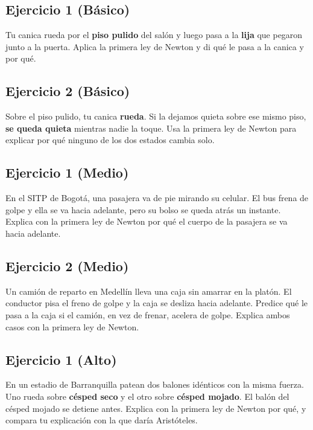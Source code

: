 \documentclass[
  spanish,
  letterpaper,
  12pt,
  oneside,
  open=any,
  DIV=15]{scrbook}
\begin{document}
\subsection{Ejercicio 1 (Básico)}\label{ejercicio-1-buxe1sico}

Tu canica rueda por el \textcolor[HTML]{2563EB}{\textbf{piso pulido}}
del salón y luego pasa a la \textcolor[HTML]{7C3AED}{\textbf{lija}} que
pegaron junto a la puerta. Aplica la primera ley de Newton y di qué le
pasa a la canica y por qué.

\subsection{Ejercicio 2 (Básico)}\label{ejercicio-2-buxe1sico}

Sobre el piso pulido, tu canica
\textcolor[HTML]{2563EB}{\textbf{rueda}}. Si la dejamos quieta sobre ese
mismo piso, \textcolor[HTML]{7C3AED}{\textbf{se queda quieta}} mientras
nadie la toque. Usa la primera ley de Newton para explicar por qué
ninguno de los dos estados cambia solo.

\subsection{Ejercicio 1 (Medio)}\label{ejercicio-1-medio}

En el SITP de Bogotá, una pasajera va de pie mirando su celular. El bus
frena de golpe y ella se va hacia adelante, pero su bolso se queda atrás
un instante. Explica con la primera ley de Newton por qué el cuerpo de
la pasajera se va hacia adelante.

\subsection{Ejercicio 2 (Medio)}\label{ejercicio-2-medio}

Un camión de reparto en Medellín lleva una caja sin amarrar en la
platón. El conductor pisa el freno de golpe y la caja se desliza hacia
adelante. Predice qué le pasa a la caja si el camión, en vez de frenar,
acelera de golpe. Explica ambos casos con la primera ley de Newton.

\subsection{Ejercicio 1 (Alto)}\label{ejercicio-1-alto}

En un estadio de Barranquilla patean dos balones idénticos con la misma
fuerza. Uno rueda sobre \textcolor[HTML]{7C3AED}{\textbf{césped seco}} y
el otro sobre \textcolor[HTML]{2563EB}{\textbf{césped mojado}}. El balón
del césped mojado se detiene antes. Explica con la primera ley de Newton
por qué, y compara tu explicación con la que daría Aristóteles.
\end{document}
